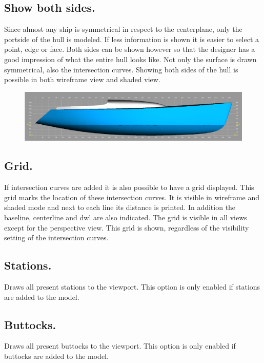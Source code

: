 \documentclass[12pt]{article}
\begin{document}
\subsection{Show both sides.}
Since almost any ship is symmetrical in respect to the centerplane,
only the portside of the hull is modeled. If less information is shown
it is easier to select a point, edge or face. Both sides can be shown
however so that the designer has a good impression of what the entire
hull looks like.  Not only the surface is drawn symmetrical, also the
intersection curves. Showing both sides of the hull is possible in
both wireframe view and shaded view.

\begin{figure}[h]
        \centering
        \includegraphics[width=15cm,natwidth=1057,natheight=239]{grid.png}
        \caption{}
        \label{fig:grid}
\end{figure}

\subsection{Grid.}
If intersection curves are added it is also possible to have a grid
displayed. This grid marks the location of these intersection
curves. It is visible in wireframe and shaded mode and next to each
line its distance is printed. In addition the baseline, centerline and
dwl are also indicated. The grid is visible in all views except for
the perspective view. This grid is shown, regardless of the visibility
setting of the intersection curves.

\subsection{Stations.}
Draws all present stations to the viewport. This option is only
enabled if stations are added to the model.

\subsection{Buttocks.}
Draws all present buttocks to the viewport. This option is only
enabled if buttocks are added to the model.
\end{document}
